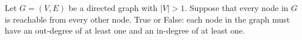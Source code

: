 \begin{prob}
    Let $G = (V, E)$ be a directed graph with $|V| > 1$. Suppose that every
    node in $G$ is reachable from every other node. True or False: each node in
    the graph must have an out-degree of at least one and an in-degree of at
    least one.

    \Tf{}

\end{prob}
